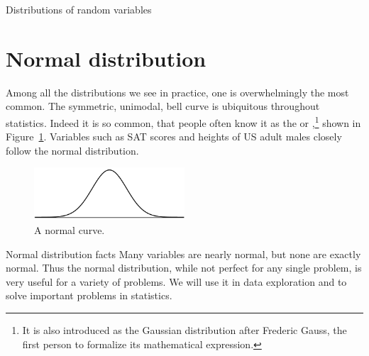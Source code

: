 \begin{chapterpage}{Distributions of random variables}
  \label{ch_distributions}
\end{chapterpage}
\renewcommand{\chapterfolder}{ch_distributions}




\section{Normal distribution}
\label{normalDist}


Among all the distributions we see in practice,
one is overwhelmingly the most common.
The symmetric, unimodal, bell curve is ubiquitous
throughout statistics.
Indeed it is so common, that people often know it as the
 or
,\footnote{It
  is also introduced as the Gaussian distribution after Frederic
  Gauss, the first person to formalize its mathematical
  expression.}
shown in Figure~\ref{simpleNormal}.
Variables such as SAT scores and heights of US adult males
closely follow the normal distribution.

\begin{figure}[h]
\centering
\includegraphics[width=0.5\textwidth]{ch_distributions/figures/simpleNormal/simpleNormal}
\caption{A normal curve.}
\label{simpleNormal}
\end{figure}

\begin{onebox}{Normal distribution facts}
  Many variables are nearly normal, but none are exactly normal.
  Thus the normal distribution, while not perfect for any single
  problem, is very useful for a variety of problems.
  We will use it in data exploration and to solve important
  problems in statistics.
\end{onebox}


